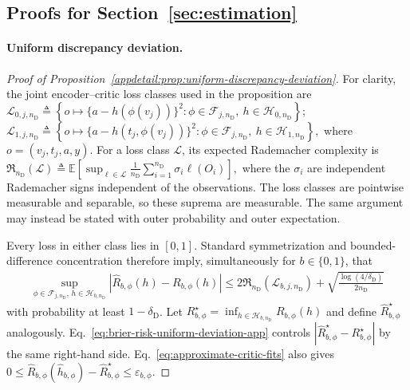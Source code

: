 \subsection{Proofs for Section~\ref{sec:estimation}}

\paragraph{Uniform discrepancy deviation.}
\begin{proof}[Proof of Proposition~\ref{appdetail:prop:uniform-discrepancy-deviation}]
For clarity, the joint encoder--critic loss classes used in the proposition are
\(\mathcal L_{0,j,n_{\mathrm D}} \triangleq \left\{ o\mapsto\{a-h(\phi(v_j))\}^2: \phi\in\mathcal F_{j,n_{\mathrm D}},\ h\in\mathcal H_{0,n_{\mathrm D}} \right\}\); \(\mathcal L_{1,j,n_{\mathrm D}} \triangleq \left\{ o\mapsto\{a-h(t_j,\phi(v_j))\}^2: \phi\in\mathcal F_{j,n_{\mathrm D}},\ h\in\mathcal H_{1,n_{\mathrm D}} \right\},\)
where $o=(v_j,t_j,a,y)$. For a loss class $\mathcal L$, its expected Rademacher complexity is
\(\mathfrak R_{n_{\mathrm D}}(\mathcal L) \triangleq \mathbb E\!\left[ \sup_{\ell\in\mathcal L} \frac1{n_{\mathrm D}}\sum_{i=1}^{n_{\mathrm D}}\sigma_i\ell(O_i) \right],\)
where the $\sigma_i$ are independent Rademacher signs independent of the observations. The loss classes are pointwise measurable and separable, so these suprema are measurable.
The same argument may instead be stated with outer probability and outer expectation.

Every loss in either class lies in $[0,1]$. Standard symmetrization and bounded-difference concentration therefore imply, simultaneously for $b\in\{0,1\}$, that
\begin{align}
\sup_{\phi\in\mathcal F_{j,n_{\mathrm D}},\,h\in\mathcal H_{b,n_{\mathrm D}}}
|\widehat R_{b,\phi}(h)-R_{b,\phi}(h)|
\le
2\mathfrak R_{n_{\mathrm D}}(\mathcal L_{b,j,n_{\mathrm D}})
+\sqrt{\frac{\log(4/\delta_{\mathrm D})}{2n_{\mathrm D}}}
\label{eq:brier-risk-uniform-deviation-app}
\end{align}
with probability at least $1-\delta_{\mathrm D}$. Let $R_{b,\phi}^{\star}=\inf_{h\in\mathcal H_{b,n_{\mathrm D}}}R_{b,\phi}(h)$ and define $\widehat R_{b,\phi}^{\star}$ analogously. Eq.~\eqref{eq:brier-risk-uniform-deviation-app} controls $|\widehat R_{b,\phi}^{\star}-R_{b,\phi}^{\star}|$ by the same right-hand side. Eq.~\eqref{eq:approximate-critic-fits} also gives
\(0 \le \widehat R_{b,\phi}(\widehat h_{b,\phi}) -\widehat R_{b,\phi}^{\star} \le \varepsilon_{b,\phi}.\)


\end{proof}
